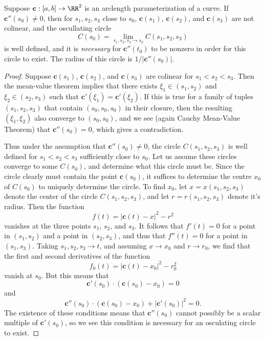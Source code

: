 \begin{theorem}
    Suppose $\mathbf{c}: [a,b] \to \RR^2$ is an arclength parameterization of a curve. If $\mathbf{c}''(s_0) \neq 0$, then for $s_1,s_2,s_3$ close to $s_0$, $\mathbf{c}(s_1)$, $\mathbf{c}(s_2)$, and $\mathbf{c}(s_3)$ are not colinear, and the oscullating circle
    \[ C(s_0) = \lim_{s_1,s_2,s_3 \to s_0} C(s_1,s_2,s_3) \]
    is well defined, and it is \emph{necessary} for $\mathbf{c}''(t_0)$ to be nonzero in order for this circle to exist. The radius of this circle is $1/|\mathbf{c}''(s_0)|$.
\end{theorem}
\begin{proof}
    Suppose $\mathbf{c}(s_1)$, $\mathbf{c}(s_2)$, and $\mathbf{c}(s_3)$ are colinear for $s_1 < s_2 < s_3$. Then the mean-value theorem implies that there exists $\xi_1 \in (s_1,s_2)$ and $\xi_2 \in (s_2,s_3)$ such that $\mathbf{c}'(\xi_1) = \mathbf{c}'(\xi_2)$. If this is true for a family of tuples $(s_1,s_2,s_3)$ that contain $(s_0,s_0,s_0)$ in their closure, then the resulting $(\xi_1,\xi_2)$ also converge to $(s_0,s_0)$, and we see (again Cauchy Mean-Value Theorem) that $\mathbf{c}''(s_0) = 0$, which gives a contradiction.

    Thus under the assumption that $\mathbf{c}''(s_0) \neq 0$, the circle $C(s_1,s_2,s_3)$ is well defined for $s_1 < s_2 < s_3$ sufficiently close to $s_0$. Let us assume these circles converge to some $C(s_0)$, and determine what this circle must be. Since the circle clearly must contain the point $\mathbf{c}(s_0)$, it suffices to determine the centre $x_0$ of $C(s_0)$ to uniquely determine the circle. To find $x_0$, let $x = x(s_1,s_2,s_3)$ denote the center of the circle $C(s_1,s_2,s_3)$, and let $r = r(s_1,s_2,s_3)$ denote it's radius. Then the function
    \[ f(t) = |\mathbf{c}(t) - x|^2 - r^2 \]
    vanishes at the three points $s_1$, $s_2$, and $s_3$. It follows that $f'(t) = 0$ for a point in $(s_1,s_2)$ and a point in $(s_2,s_3)$, and thus that $f''(t) = 0$ for a point in $(s_1,s_3)$. Taking $s_1,s_2,s_3 \to t$, and assuming $x \to x_0$ and $r \to r_0$, we find that the first and second derivatives of the function
    \[ f_0(t) = |\mathbf{c}(t) - x_0|^2 - r_0^2 \]
    vanish at $s_0$. But this means that
    \[ \mathbf{c}'(s_0) \cdot ( \mathbf{c}(s_0) - x_0 ) = 0 \]
    and
    \[ \mathbf{c}''(s_0) \cdot (\mathbf{c}(s_0) - x_0) + |\mathbf{c}'(s_0)|^2 = 0. \]
    The existence of these conditions means that $\mathbf{c}''(s_0)$ cannot possibly be a scalar multiple of $\mathbf{c}'(s_0)$, so we see this condition is necessary for an osculating circle to exist.


\end{proof}
